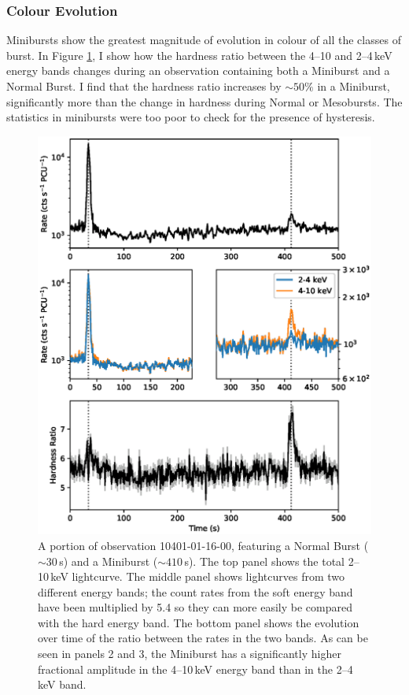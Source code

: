 \subsubsection{Colour Evolution}

\par Minibursts show the greatest magnitude of evolution in colour of all the classes of burst.  In Figure \ref{fig:minihard}, I show how the hardness ratio between the 4--10 and 2--4\,keV energy bands changes during an observation containing both a Miniburst and a Normal Burst.  I find that the hardness ratio increases by $\sim50\%$ in a Miniburst, significantly more than the change in hardness during Normal or Mesobursts.  The statistics in minibursts were too poor to check for the presence of hysteresis.

\begin{figure}
  \centering
  \includegraphics[width=.9\linewidth, trim={0.7cm 1.4cm 0.2cm 1.4cm},clip]{images/hardness_mini.eps}
  \caption[A portion of observation 10401-01-16-00, featuring a fNormal Burst and a Miniburst.]{\small A portion of observation 10401-01-16-00, featuring a Normal Burst ($\sim30$\,s) and a Miniburst ($\sim410$\,s).  The top panel shows the total 2--10\,keV lightcurve.  The middle panel shows lightcurves from two different energy bands; the count rates from the soft energy band have been multiplied by 5.4 so they can more easily be compared with the hard energy band.  The bottom panel shows the evolution over time of the ratio between the rates in the two bands.   As can be seen in panels 2 and 3, the Miniburst has a significantly higher fractional amplitude in the 4--10\,keV energy band than in the 2--4\,keV band.}
  \label{fig:minihard}
\end{figure}

